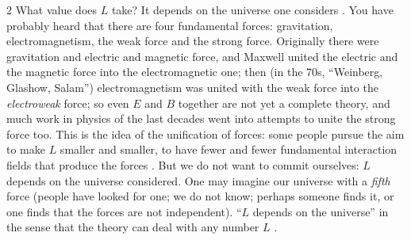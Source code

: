 \begin{paracol}{2}
What value does $L$ take? It depends on the universe one considers . You have probably heard that there are four fundamental forces: gravitation, electromagnetism, the weak force and the strong force. Originally there were gravitation and electric and magnetic force,
and Maxwell united the electric and the magnetic force into the electromagnetic one; then (in the 70s, ``Weinberg, Glashow, Salam'') electromagnetism was united with the weak force into the \emph{electroweak} force; so even $E$ and $B$ together are not yet a complete theory,
and much work in physics of the last decades went into attempts to unite the strong force too. This is the idea of the unification of forces: some people pursue the aim to make $L$ smaller and smaller, to have fewer and fewer fundamental interaction fields that
produce the forces . But we do not want to commit ourselves: $L$ depends on the universe considered. One may imagine our universe with a \emph{fifth} force (people have looked for one; we do not know; perhaps someone finds it, or one finds that the forces
are not independent). ``$L$ depends on the universe'' in the sense that the theory can deal with any number $L$ .


\end{paracol}
